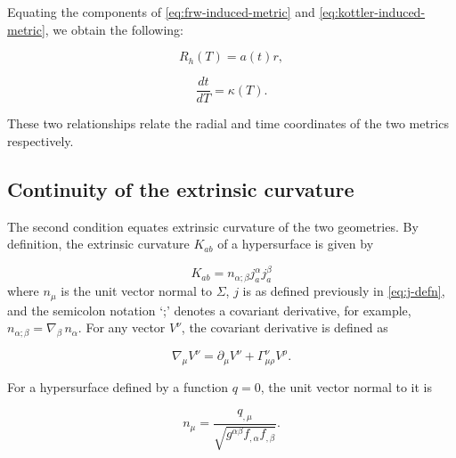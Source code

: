 Equating the components of \autoref{eq:frw-induced-metric} and \autoref{eq:kottler-induced-metric}, we obtain the following:

\begin{equation}
  R_h(T) = a(t)r
  \label{eq:r-to-ar},
\end{equation}

\begin{equation}
  \frac{dt}{dT} = \kappa(T).
  \label{eq:dt-dT}
\end{equation}


These two relationships relate the radial and time coordinates of the two metrics respectively. 

\subsection{Continuity of the extrinsic curvature}

The second condition equates extrinsic curvature of the two geometries. By definition, the extrinsic curvature $K_{ab}$ of a hypersurface is given by

\begin{equation}
  K_{ab} = n_{\alpha;\beta} j^{\alpha}_{a} j^{\beta}_{a}
  \label{eq:extrinsic-curvature-defn}
\end{equation}
where $n_{\mu}$ is the unit vector normal to $\Sigma$, $j$ is as defined previously in \autoref{eq:j-defn}, and the semicolon notation `;' denotes a covariant derivative, for example, $n_{\alpha;\beta} = \nabla_{\beta}\, n_{\alpha}$. For any vector $V^{\nu}$, the covariant derivative is defined as

\begin{equation}
  \nabla_{\mu}V^{\nu} = \partial_{\mu}V^{\nu} + \Gamma^{\nu}_{\mu \rho} V^{\rho}.
  \label{eq:covariant-derivative-defn}
\end{equation}

For a hypersurface defined by a function $q = 0$, the unit vector normal to it is

\begin{equation}
  n_{\mu} = \frac{q_{,\mu}}{\sqrt{g^{\alpha \beta} f_{,\alpha} f_{,\beta}}}.
  \label{eq:unit-normal-vector}
\end{equation}


